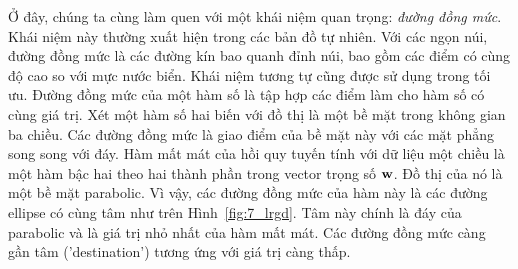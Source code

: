 Ở đây, chúng ta cùng làm quen với một khái niệm quan trọng: \textit{đường đồng
mức}. Khái niệm này thường xuất hiện trong các bản đồ tự nhiên. Với các ngọn
núi, đường đồng mức là các đường kín bao quanh đỉnh núi, bao gồm các điểm có
cùng độ cao so với mực nước biển. Khái niệm tương tự cũng được sử dụng trong tối
ưu. {Đường đồng mức} của một hàm số là tập hợp các điểm làm cho hàm số có cùng
giá trị. Xét một hàm số hai biến với đồ thị là một {bề mặt} trong
không gian ba chiều. Các đường đồng mức là giao điểm của bề mặt này với các mặt
phẳng song song với đáy. Hàm mất mát của hồi quy tuyến tính với dữ liệu một
chiều là một hàm bậc hai theo hai thành phần trong vector trọng số $\mathbf{w}$. Đồ thị
của nó là một bề mặt parabolic. Vì vậy, các đường đồng mức của hàm này là các
đường ellipse có cùng tâm như trên Hình~\ref{fig:7_lrgd}. Tâm này chính là đáy
của parabolic và là giá trị nhỏ nhất của hàm mất mát. Các đường đồng mức càng
gần {tâm} ('destination') tương ứng với giá trị càng thấp.%







